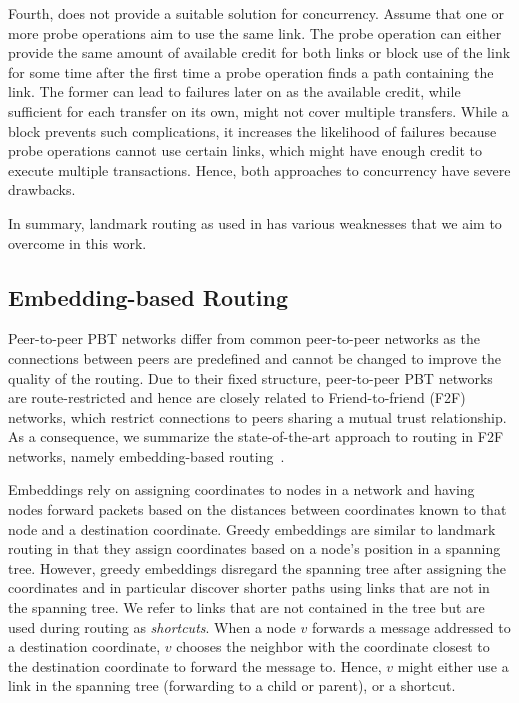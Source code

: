 Fourth, \cnsysname does not provide a suitable solution for concurrency.
Assume that one or more probe operations aim to use the same link. 
The probe operation can either provide the same amount of available credit for both links or block use
of the link for some time after the first time a probe operation finds a path containing the link.
The former can lead to failures later on as the available credit, while sufficient for each transfer on its own, might not cover multiple transfers.  
While a block prevents such complications, it increases the likelihood of failures because probe operations cannot use certain links, which might have enough credit to execute multiple transactions.   
 Hence, both approaches to concurrency have severe drawbacks. 
 
In summary, landmark routing as used in \cnsysname has various weaknesses that we aim to overcome in this work. 

\subsection{Embedding-based Routing}
\label{sec:embedding}

Peer-to-peer PBT networks differ from common peer-to-peer networks as the connections between peers are predefined and cannot be changed to improve the quality of the routing. Due to their fixed structure, peer-to-peer PBT networks are route-restricted and hence are closely related to Friend-to-friend (F2F) networks, which restrict connections to peers sharing a mutual trust relationship. As a consequence, we summarize the state-of-the-art approach to routing in F2F networks, namely embedding-based routing~\cite{papadimitriou2004conjecture,roos2016anonymous}. 

Embeddings rely on assigning coordinates to nodes in a network and having nodes forward packets based on the distances between coordinates known to that node and a destination coordinate.
Greedy embeddings are similar to landmark routing in that they assign coordinates based on a node's position in a spanning tree. However, greedy embeddings disregard the spanning tree  after assigning the coordinates and in particular discover shorter paths using links that are not in the spanning tree. We refer to links that are not contained in the tree but are used during routing as \emph{shortcuts}. When a node $v$ forwards a message  addressed to a destination coordinate,
$v$ chooses the neighbor with the coordinate closest to the destination coordinate to forward the message to. Hence,  $v$ might either use a link in the spanning tree (forwarding to a child or parent), or a shortcut. 

